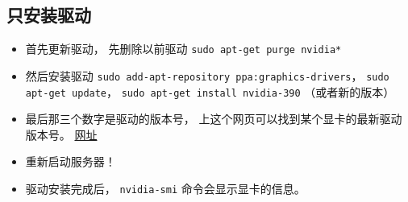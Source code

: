 \subsection{只安装驱动}
\begin{itemize}
\item 首先更新驱动， 先删除以前驱动 \verb|sudo apt-get purge nvidia*|
\item 然后安装驱动 \verb|sudo add-apt-repository ppa:graphics-drivers|， \verb|sudo apt-get update|， \verb|sudo apt-get install nvidia-390| （或者新的版本）
\item 最后那三个数字是驱动的版本号， 上这个网页可以找到某个显卡的最新驱动版本号。 \href{http://www.nvidia.com/Download/index.aspx?lang=en-us}{网址}
\item 重新启动服务器！
\item 驱动安装完成后， \verb|nvidia-smi| 命令会显示显卡的信息。
\end{itemize}
